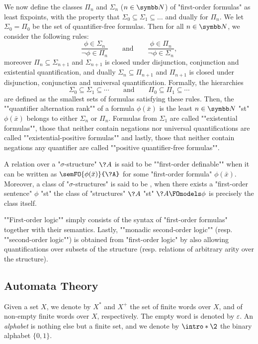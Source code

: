 We now define the classes $\Pi_n$ and $\Sigma_n$ ($n\in\N$) of "first-order formulas"
as least fixpoints, with the property that $\Sigma_0 \subseteq \Sigma_1 \subseteq \dotsc$ and dually for $\Pi_n$.
We let $\Sigma_0 = \Pi_0$ be the set of quantifier-free formulas.
Then for all $n\in\N$, we consider the following rules:
\[
	\frac{
		\phi \in \Sigma_n
	}{
		\neg \phi \in \Pi_n
	} \qquad\text{and}\qquad
	\frac{
		\phi \in \Pi_n
	}{
		\neg \phi \in \Sigma_n
	},
\]
moreover $\Pi_n \subseteq \Sigma_{n+1}$ and $\Sigma_{n+1}$ is closed under
disjunction, conjunction and existential quantification,
and dually $\Sigma_n \subseteq \Pi_{n+1}$ and $\Pi_{n+1}$ is closed under
disjunction, conjunction and universal quantification.
Formally, the hierarchies
\[
	\Sigma_0 \subseteq \Sigma_1 \subseteq \cdots
	\qquad\text{and}\qquad
	\Pi_0 \subseteq \Pi_1 \subseteq \cdots
\]
are defined as the smallest sets of formulas satisfying these rules.
Then, the \AP""quantifier alternation rank"" of a formula $\phi(\bar x)$
is the least $n\in\N$ "st" $\phi(\bar x)$ belongs to either
$\Sigma_n$ or $\Pi_n$.
Formulas from $\Sigma_1$ are called ""existential formulas"",
those that neither contain negations nor universal quantifications are called \AP""existential-positive formulas"" and lastly, those that neither contain negations any quantifier
are called ""positive quantifier-free formulas"".

A relation over a "$\sigma$-structure" $\?A$ is said to be
\AP""first-order definable"" when it can be written as
$\semFO{\phi(\bar x)}{\?A}$ for some "first-order formula" $\phi(\bar x)$.
Moreover, a class of "$\sigma$-structures" is said to be ,
when there exists a "first-order sentence" $\phi$ "st" the class of "structures" $\?A$
"st" $\?A \FOmodels \phi$ is precisely the class itself.

\AP""First-order logic"" simply consists of the syntax of "first-order formulas" together
with their semantics. Lastly, \AP""monadic second-order logic""
(resp. ""second-order logic"") is obtained from "first-order logic"
by also allowing quantifications over subsets of the structure
(resp. relations of arbitrary arity over the structure).

\subsection{Automata Theory}

Given a set $X$, we denote by $X^*$ and $X^+$ the set of finite words
over $X$, and of non-empty finite words over $X$, respectively.
The empty word is denoted by $\varepsilon$.
An \emph{alphabet} is nothing else but a finite set, and we denote by
$\intro*\2$ the binary alphabet $\{0,1\}$.

